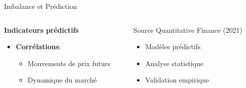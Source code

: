 \documentclass[aspectratio=169]{beamer}  %
\begin{document}
\begin{frame}{Imbalance et Prédiction}
    \begin{columns}
        \begin{column}{0.6\textwidth}
            \textbf{Indicateurs prédictifs}
            \begin{itemize}
                \begin{itemize}
                    \item Indicateur avancé
                    \item Forte capacité prédictive
                \end{itemize}
                \item \textbf{Corrélations}:
                \begin{itemize}
                    \item Mouvements de prix futurs
                    \item Dynamique du marché
                \end{itemize}
            \end{itemize}
        \end{column}
        \begin{column}{0.4\textwidth}
            \begin{alertblock}{Source}
                \small{Quantitative Finance (2021)}
                \begin{itemize}
                    \item Modèles prédictifs
                    \item Analyse statistique
                    \item Validation empirique
                \end{itemize}
            \end{alertblock}
        \end{column}
    \end{columns}
\end{frame}
\end{document}
